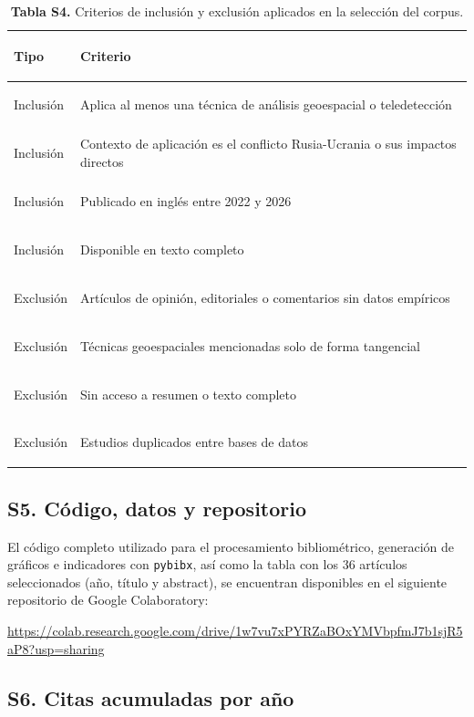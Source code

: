 \documentclass[12pt, a4paper]{article}
\begin{document}
\begin{table}[H]
\centering
\footnotesize
\renewcommand{\arraystretch}{1.15}
\begin{tabularx}{\textwidth}{>{\bfseries\raggedright\arraybackslash}p{2cm} >{\raggedright\arraybackslash}X}
\rowcolor{tableheader}
{\color{white}\bfseries Tipo} & {\color{white}\bfseries Criterio} \\
\midrule
Inclusión & Aplica al menos una técnica de análisis geoespacial o teledetección \\
\rowcolor{tablerow}
Inclusión & Contexto de aplicación es el conflicto Rusia-Ucrania o sus impactos directos \\
Inclusión & Publicado en inglés entre 2022 y 2026 \\
\rowcolor{tablerow}
Inclusión & Disponible en texto completo \\
Exclusión & Artículos de opinión, editoriales o comentarios sin datos empíricos \\
\rowcolor{tablerow}
Exclusión & Técnicas geoespaciales mencionadas solo de forma tangencial \\
Exclusión & Sin acceso a resumen o texto completo \\
\rowcolor{tablerow}
Exclusión & Estudios duplicados entre bases de datos \\
\bottomrule
\end{tabularx}
\caption*{\textbf{Tabla S4.} Criterios de inclusión y exclusión aplicados en la selección del corpus.}
\end{table}

\subsection*{S5. Código, datos y repositorio}

El código completo utilizado para el procesamiento bibliométrico, generación de gráficos e indicadores con \texttt{pybibx}, así como la tabla con los 36 artículos seleccionados (año, título y abstract), se encuentran disponibles en el siguiente repositorio de Google Colaboratory:

\begin{tcolorbox}[colback=lightbg, colframe=accent, arc=3pt, boxrule=0.6pt,
    left=8pt, right=8pt, top=6pt, bottom=6pt]
\small\ttfamily\raggedright
\url{https://colab.research.google.com/drive/1w7vu7xPYRZaBOxYMVbpfmJ7b1sjR5aP8?usp=sharing}
\end{tcolorbox}

\subsection*{S6. Citas acumuladas por año}
\end{document}
